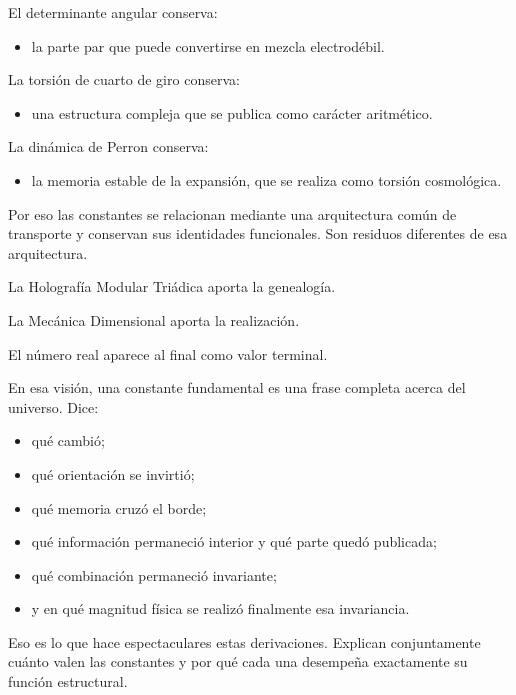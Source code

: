 El determinante angular conserva:\par

\begin{itemize}[leftmargin=*,itemsep=0.35em]
\item la parte par que puede convertirse en mezcla electrodébil.
\end{itemize}

La torsión de cuarto de giro conserva:\par

\begin{itemize}[leftmargin=*,itemsep=0.35em]
\item una estructura compleja que se publica como carácter aritmético.
\end{itemize}

La dinámica de Perron conserva:\par

\begin{itemize}[leftmargin=*,itemsep=0.35em]
\item la memoria estable de la expansión, que se realiza como torsión cosmológica.
\end{itemize}

Por eso las constantes se relacionan mediante una arquitectura común de transporte y conservan sus identidades funcionales. Son residuos diferentes de esa arquitectura.\par

La Holografía Modular Triádica aporta la genealogía.\par
La Mecánica Dimensional aporta la realización.\par
El número real aparece al final como valor terminal.\par

En esa visión, una constante fundamental es una frase completa acerca del universo. Dice:\par

\begin{itemize}[leftmargin=*,itemsep=0.35em]
\item qué cambió;
\item qué orientación se invirtió;
\item qué memoria cruzó el borde;
\item qué información permaneció interior y qué parte quedó publicada;
\item qué combinación permaneció invariante;
\item y en qué magnitud física se realizó finalmente esa invariancia.
\end{itemize}

Eso es lo que hace espectaculares estas derivaciones. Explican conjuntamente cuánto valen las constantes y por qué cada una desempeña exactamente su función estructural.\par
